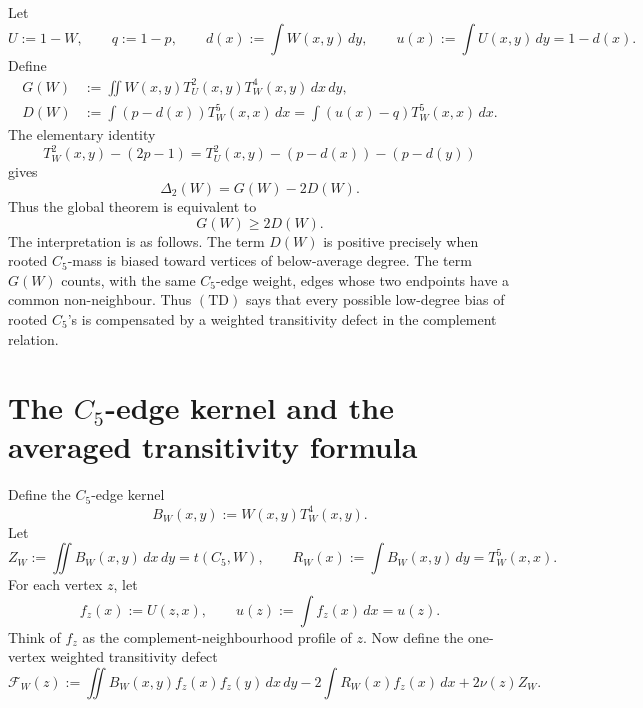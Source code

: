 \documentclass[11pt]{article}
\newcommand{\dd}{\,d}
\newcommand{\DeltaTwo}{\Delta_2}
\begin{document}
Let
\[
U:=1-W,\qquad q:=1-p,
\qquad d(x):=\int W(x,y)\dd y,
\qquad u(x):=\int U(x,y)\dd y=1-d(x).
\]
Define
\begin{align}
G(W)&:=\iint W(x,y)T_U^2(x,y)T_W^4(x,y)\dd x\dd y,\label{eq:G}\\
D(W)&:=\int (p-d(x))T_W^5(x,x)\dd x
      =\int (u(x)-q)T_W^5(x,x)\dd x.\label{eq:D}
\end{align}
The elementary identity
\begin{equation}
T_W^2(x,y)-(2p-1)
=T_U^2(x,y)-(p-d(x))-(p-d(y))
\label{eq:basic-identity}
\end{equation}
gives
\begin{equation}
\boxed{\DeltaTwo(W)=G(W)-2D(W).}
\label{eq:Gminus2D}
\end{equation}
Thus the global theorem is equivalent to
\begin{equation}
\boxed{G(W)\ge 2D(W).}
\tag{TD}
\end{equation}
The interpretation is as follows.  The term \(D(W)\) is positive precisely when
rooted \(C_5\)-mass is biased toward vertices of below-average degree.  The term
\(G(W)\) counts, with the same \(C_5\)-edge weight, edges whose two endpoints have
a common non-neighbour.  Thus \((\mathrm{TD})\) says that every possible
low-degree bias of rooted \(C_5\)'s is compensated by a weighted transitivity
defect in the complement relation.

\section{The \(C_5\)-edge kernel and the averaged transitivity formula}

Define the \(C_5\)-edge kernel
\begin{equation}
B_W(x,y):=W(x,y)T_W^4(x,y).
\end{equation}
Let
\begin{equation}
Z_W:=\iint B_W(x,y)\dd x\dd y=t(C_5,W),
\qquad
R_W(x):=\int B_W(x,y)\dd y=T_W^5(x,x).
\end{equation}
For each vertex \(z\), let
\begin{equation}
f_z(x):=U(z,x),
\qquad
u(z):=\int f_z(x)\dd x=u(z).
\end{equation}
Think of \(f_z\) as the complement-neighbourhood profile of \(z\).
Now define the one-vertex weighted transitivity defect
\begin{equation}
\mathcal F_W(z):=
\iint B_W(x,y)f_z(x)f_z(y)\dd x\dd y
-2\int R_W(x)f_z(x)\dd x
+2\nu(z)Z_W.
\label{eq:Fz}
\end{equation}
\end{document}
